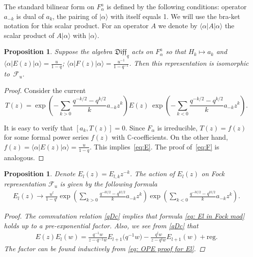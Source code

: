 \documentclass[pdftex]{sigma}
\numberwithin{equation}{section}
\newtheorem{Proposition}[Theorem]{Proposition}
\theoremstyle{definition}
\newcommand{\valpha}{| \alpha \rangle}
\newcommand{\qD}{\mathfrak{Diff}_q}
\begin{document}
The standard bilinear form on $F^a_{\alpha}$ is defined by the following conditions: operator $a_{-k}$ is dual of $a_k$, the pairing of $\valpha$ with itself equals 1. We will use the bra-ket notation for this scalar product. For an operator $A$ we denote by $\langle \alpha | A | \alpha \rangle$ the scalar product of $A | \alpha \rangle$ with $\valpha$.

\begin{Proposition}\label{Fock} Suppose the algebra $\qD$ acts on $F^a_{\alpha}$ so that $H_k \mapsto a_k$ and $\langle \alpha | E(z) | \alpha \rangle = \frac{u}{1-q}$; $\langle \alpha | F(z) | \alpha \rangle = \frac{u^{-1}}{1-q^{-1}}$.
Then this representation is isomorphic to~$\mathcal{F}_u$.
\end{Proposition}

\begin{proof} Consider the current \[T(z) =\exp \! \left( - \sum_{k>0} \frac{q^{-k/2}-q^{k/2}}{k} a_{-k} z^k \right) E(z) \ \exp \! \left( - \sum_{k<0}\frac{q^{-k/2}-q^{k/2}}{k} a_{-k} z^k \right).\]

It is easy to verify that $[a_k, T(z)] =0$. Since $F_{\alpha}$ is irreducible, $T(z)= f(z)$ for some formal power series $f(z)$ with $\mathbb{C}$-coefficients. On the other hand, $f(z) = \langle \alpha | E(z) | \alpha \rangle = \frac{u}{1-q} $. This implies~\eqref{eq:E}. The proof of~\eqref{eq:F} is analogous.
\end{proof}

\begin{Proposition} \label{E_l}
Denote $E_l(z) = E_{l, k} z^{-k}$. The action of $E_l(z)$ on Fock representation $\mathcal{F}_u$ is given by the following formula
\begin{gather} \label{eq: El in Fock mod}
E_l(z) \rightarrow \frac{u^l}{1-q^l} \exp \! \left( \sum_{k>0} \frac{q^{-kl/2}-q^{kl/2}}{k} a_{-k} z^k \right) \exp \! \left( \sum_{k<0} \frac{q^{-kl/2}-q^{kl/2}}{k} a_{-k} z^k \right).
\end{gather}
\begin{proof}
The commutation relation \eqref{qDc} implies that formula \eqref{eq: El in Fock mod} holds up to a pre-exponential factor. Also, we see from \eqref{qDc} that
\begin{gather} \label{eq: OPE proof for El}
E(z) E_l(w) = \frac{q^{-1}w}{z-q^{-1}w} E_{l+1}\big(q^{-1}w\big) - \frac{q^l w }{z-q^l w} E_{l+1}(w) + \mathrm{reg}.
\end{gather}
The factor can be found inductively from \eqref{eq: OPE proof for El}.
\end{proof}
\end{Proposition}
\end{document}
